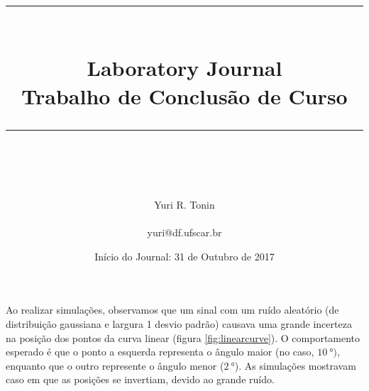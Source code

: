 \documentclass[idxtotoc,hyperref,openany]{labbook} %
\newcommand{\HRule}{\rule{\linewidth}{0.5mm}} %
\begin{document}

\frontmatter %
\title{
\begin{center}
\HRule \\[0.4cm]
{\Huge \bfseries Laboratory Journal \\[0.5cm] \Large Trabalho de Conclusão de Curso}\\[0.4cm] %
\HRule \\[1.5cm]
\end{center}
}
\author{\Huge Yuri R. Tonin \\ \\ \LARGE yuri@df.ufscar.br \\[2cm]} %
\date{Início do Journal: 31 de Outubro de 2017} %
\maketitle

\tableofcontents

\mainmatter %













Ao realizar simulações, observamos que um sinal com um ruído aleatório (de distribuição gaussiana e largura 1 desvio padrão) causava uma grande incerteza na posição dos pontos da curva linear (figura \ref{fig:linearcurve}). O comportamento esperado é que o ponto a esquerda representa o ângulo maior (no caso, $\SI{10}{\degree})$, enquanto que o outro represente o ângulo menor ($\SI{2}{\degree}$). As simulações mostravam caso em que as posições se invertiam, devido ao grande ruído. 
\end{document}
